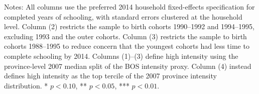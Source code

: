 \begin{table}[H]
\centering
\caption{Appendix: Sensitivity Checks for Completed Years of Schooling\label{tab:appendix_robust_years}}
\footnotesize
{}

\vspace{0.5em}
\parbox{0.95\linewidth}{\footnotesize Notes: All columns use the preferred 2014 household fixed-effects specification for completed years of schooling, with standard errors clustered at the household level. Column (2) restricts the sample to birth cohorts 1990--1992 and 1994--1995, excluding 1993 and the outer cohorts. Column (3) restricts the sample to birth cohorts 1988--1995 to reduce concern that the youngest cohorts had less time to complete schooling by 2014. Columns (1)--(3) define high intensity using the province-level 2007 median split of the BOS intensity proxy. Column (4) instead defines high intensity as the top tercile of the 2007 province intensity distribution. * $p<0.10$, ** $p<0.05$, *** $p<0.01$.}
\end{table}
